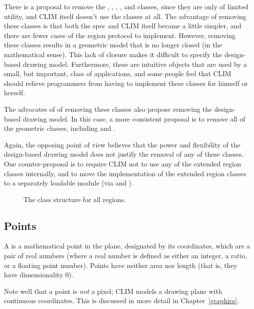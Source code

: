  {There is a proposal to remove the ,
, , , and  classes, since
they are only of limited utility, and CLIM itself doesn't use the classes at
all.  The advantage of removing these classes is that both the spec and CLIM
itself become a little simpler, and there are fewer cases of the region protocol
to implement.  However, removing these classes results in a geometric model that
is no longer closed (in the mathematical sense).  This lack of closure makes it
difficult to specify the design-based drawing model.  Furthermore, these are
intuitive objects that are used by a small, but important, class of
applications, and some people feel that CLIM should relieve programmers from
having to implement these classes for himself or herself.

The advocates of of removing these classes also propose removing the
design-based drawing model.  In this case, a more consistent proposal is to
remove all of the geometric classes, including  and .

Again, the opposing point of view believes that the power and flexibility of the
design-based drawing model does not justify the removal of any of these classes.
One counter-proposal is to require CLIM not to use any of the extended region
classes internally, and to move the implementation of the extended region
classes to a separately loadable module (via  and ).}

\begin{figure}
\ifpsfig\centerline{}\else\vspace{2.0in}\fi
\caption{The class structure for all regions.}
\end{figure}


\subsection {Points}

A  is a mathematical point in the plane, designated by its
coordinates, which are a pair of real numbers (where a real number is defined as
either an integer, a ratio, or a floating point number).  Points have neither
area nor length (that is, they have dimensionality 0).

Note well that a point is {\sl not} a pixel; CLIM models a drawing plane with
continuous coordinates.  This is discussed in more detail in
Chapter~\ref{graphics}.

